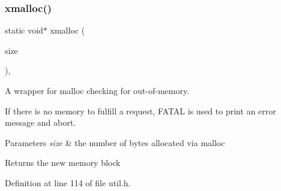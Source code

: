 \subsubsection{\texorpdfstring{xmalloc()}{xmalloc()}}
{\footnotesize\ttfamily static void$\ast$ xmalloc (\begin{DoxyParamCaption}\item[{size\+\_\+t}]{size }\end{DoxyParamCaption})\hspace{0.3cm}{\ttfamily [inline]}, {\ttfamily [static]}}



A wrapper for malloc checking for out-\/of-\/memory. 

If there is no memory to fulfill a request, F\+A\+T\+AL is used to print an error message and abort.


\begin{DoxyParams}{Parameters}
{\em size} & the number of bytes allocated via malloc \\
\hline
\end{DoxyParams}
\begin{DoxyReturn}{Returns}
the new memory block 
\end{DoxyReturn}


Definition at line 114 of file util.\+h.

